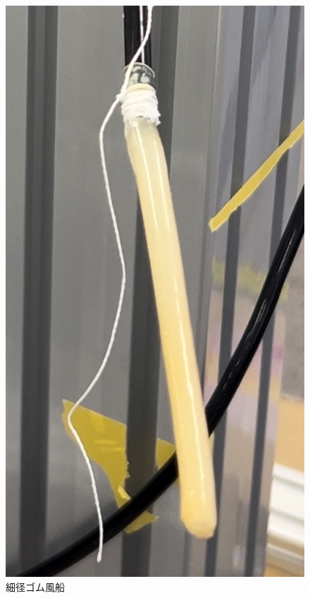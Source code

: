 \begin{figure}[h]
  \begin{minipage}[b]{0.33\hsize}
    \centering
    \includegraphics[scale=0.2]{pic/10.jpg}
    \caption{細径ゴム風船}
    \label{fig:huu}
  \end{minipage}  
  \begin{minipage}[b]{0.33\hsize}

\end{minipage}
\end{figure}
